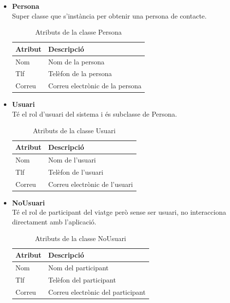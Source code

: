 
\begin{itemize}

\item[]\textbf{Persona}\\
Super classe que s'instància per obtenir una persona de contacte.
\begin{table}[!h]
\begin{tabular}{|M|T|}
\hline
\textbf{Atribut}  & \textbf{Descripció} \\\hline
Nom &  Nom de la persona\\\hline
Tlf &  Telèfon de la persona\\\hline
Correu &  Correu electrònic de la persona\\\hline
\end{tabular}
\label{}
\caption{Atributs de la classe Persona}
\end{table}

\item[]\textbf{Usuari}\\
Té el rol d'usuari del sistema i és subclasse de Persona.
\begin{table}[!h]
\begin{tabular}{|M|T|}
\hline
\textbf{Atribut}  & \textbf{Descripció} \\\hline
Nom &  Nom de l'usuari\\\hline
Tlf &  Telèfon de l'usuari\\\hline
Correu &  Correu electrònic de l'usuari\\\hline
\end{tabular}
\label{}
\caption{Atributs de la classe Usuari}
\end{table}

\item[]\textbf{NoUsuari}\\
Té el rol de participant del viatge però sense ser usuari, no interacciona directament amb l'aplicació.

\begin{table}[!h]
\begin{tabular}{|M|T|}
\hline
\textbf{Atribut}  & \textbf{Descripció} \\\hline
Nom &  Nom del participant\\\hline
Tlf &  Telèfon del participant\\\hline
Correu &  Correu electrònic del participant\\\hline
\end{tabular}
\label{}
\caption{Atributs de la classe NoUsuari}
\end{table}


\end{itemize}

